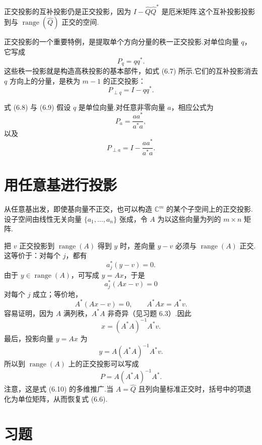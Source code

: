 \documentclass[UTF8,fontset=none,12pt]{ctexart}
\newcommand{\C}{\mathbb{C}}
\newcommand{\range}{\operatorname{range}}
\theoremstyle{definition}
\begin{document}
正交投影的互补投影仍是正交投影，因为 $I-\widehat Q\widehat Q^*$ 是厄米矩阵.这个互补投影投影到与 $\range(\widehat Q)$ 正交的空间.

\newpage
正交投影的一个重要特例，是提取单个方向分量的秩一正交投影.对单位向量 $q$，它写成
\begin{equation}
    P_q=qq^*.
    \tag{6.8}
\end{equation}
这些秩一投影就是构造高秩投影的基本部件，如式 (6.7) 所示.它们的互补投影消去 $q$ 方向上的分量，是秩为 $m-1$ 的正交投影：
\begin{equation}
    P_{\perp q}=I-qq^*.
    \tag{6.9}
\end{equation}

式 (6.8) 与 (6.9) 假设 $q$ 是单位向量.对任意非零向量 $a$，相应公式为
\begin{equation}
    P_a=\frac{aa^*}{a^*a},
    \tag{6.10}
\end{equation}
以及
\begin{equation}
    P_{\perp a}=I-\frac{aa^*}{a^*a}.
    \tag{6.11}
\end{equation}

\section*{用任意基进行投影}

从任意基出发，即使基向量不正交，也可以构造 $\C^m$ 的某个子空间上的正交投影.设子空间由线性无关向量 $\{a_1,\ldots,a_n\}$ 张成，令 $A$ 为以这些向量为列的 $m\times n$ 矩阵.

把 $v$ 正交投影到 $\range(A)$ 得到 $y$ 时，差向量 $y-v$ 必须与 $\range(A)$ 正交.这等价于：对每个 $j$，都有
\[
    a_j^*(y-v)=0.
\]
由于 $y\in\range(A)$，可写成 $y=Ax$，于是
\[
    a_j^*(Ax-v)=0
\]
对每个 $j$ 成立；等价地，
\[
    A^*(Ax-v)=0,\qquad A^*Ax=A^*v.
\]
容易证明，因为 $A$ 满列秩，$A^*A$ 非奇异（见习题 6.3）.因此
\begin{equation}
    x=(A^*A)^{-1}A^*v.
    \tag{6.12}
\end{equation}
最后，投影向量 $y=Ax$ 为
\[
    y=A(A^*A)^{-1}A^*v.
\]
所以到 $\range(A)$ 上的正交投影可以写成
\begin{equation}
    P=A(A^*A)^{-1}A^*.
    \tag{6.13}
\end{equation}
注意，这是式 (6.10) 的多维推广.当 $A=\widehat Q$ 且列向量标准正交时，括号中的项退化为单位矩阵，从而恢复式 (6.6).

\section*{习题}
\end{document}
